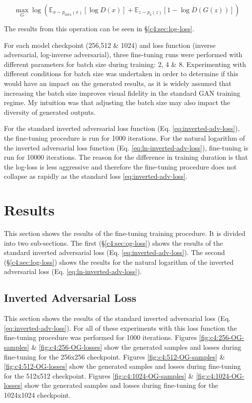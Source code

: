 \begin{equation} 
  \max_{G}\log(\mathbb{E}_{x\sim p_{\text{data}}(x)}[\log{D(x)}] +  \mathbb{E}_{z\sim p_{\text{z}}(z)}[1 - \log{D(G(z))}])
  \label{eq:ln-inverted-adv-loss}
  \end{equation}

The results from this operation can be seen in \S \ref{c4:sec:log-loss}.

For each model checkpoint (256,512 \& 1024) and loss function (inverse adversarial, log-inverse adversarial), three fine-tuning runs were performed with different parameters for batch size during training: 2, 4 \& 8.
Experimenting with different conditions for batch size was undertaken in order to determine if this would have an impact on the generated results, as it is widely assumed that increasing the batch size improves visual fidelity in the standard GAN training regime. 
My intuition was that adjusting the batch size may also impact the diversity of generated outputs.

For the standard inverted adversarial loss function (Eq. \ref{eq:inverted-adv-loss}), the fine-tuning procedure is run for 1000 iterations.
For the natural logarithm of the inverted adversarial loss function (Eq. \ref{eq:ln-inverted-adv-loss}), fine-tuning is run for 10000 iterations.
The reason for the difference in training duration is that the log-loss is less aggressive and therefore the fine-tuning procedure does not collapse as rapidly as the standard loss \ref{eq:inverted-adv-loss}.

\section{Results}
\label{c4:sec:results}

This section shows the results of the fine-tuning training procedure. 
It is divided into two sub-sections.
The first (\S \ref{c4:sec:og-loss}) shows the results of the standard inverted adversarial loss (Eq. \ref{eq:inverted-adv-loss}).
The second (\S \ref{c4:sec:log-loss}) shows the results for the natural logarithm of the inverted adversarial loss (Eq. \ref{eq:ln-inverted-adv-loss}).

\subsection{Inverted Adversarial Loss}
\FloatBarrier

This section shows the results of the standard inverted adversarial loss (Eq. \ref{eq:inverted-adv-loss}). For all of these experiments with this loss function the fine-tuning procedure was performed for 1000 iterations.
Figures \ref{fig:c4:256-OG-samples} \& \ref{fig:c4:256-OG-losses} show the generated samples and losses during fine-tuning for the 256x256 checkpoint.
Figures \ref{fig:c4:512-OG-samples} \& \ref{fig:c4:512-OG-losses} show the generated samples and losses during fine-tuning for the 512x512 checkpoint.
Figures \ref{fig:c4:1024-OG-samples} \& \ref{fig:c4:1024-OG-losses} show the generated samples and losses during fine-tuning for the 1024x1024 checkpoint.

